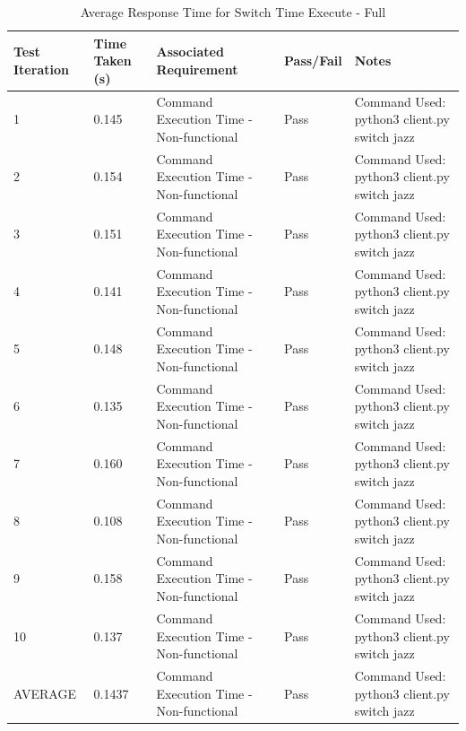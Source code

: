 \begin{table}[H]
  \centering
  \caption{Average Response Time for Switch Time Execute - Full}
  \label{tab:avgResTimeFullSwTE}
  \begin{tabularx}{\linewidth}{XlXlX}
    \toprule
    Test Iteration & Time Taken (s) & Associated Requirement & Pass/Fail & Notes \\
    \midrule
    1  & 0.145 & Command Execution Time - Non-functional & Pass & Command Used: python3 client.py switch jazz \\
    2  & 0.154 & Command Execution Time - Non-functional & Pass & Command Used: python3 client.py switch jazz \\
    3  & 0.151 & Command Execution Time - Non-functional & Pass & Command Used: python3 client.py switch jazz \\
    4  & 0.141 & Command Execution Time - Non-functional & Pass & Command Used: python3 client.py switch jazz \\
    5  & 0.148 & Command Execution Time - Non-functional & Pass & Command Used: python3 client.py switch jazz \\
    6  & 0.135 & Command Execution Time - Non-functional & Pass & Command Used: python3 client.py switch jazz \\
    7  & 0.160 & Command Execution Time - Non-functional & Pass & Command Used: python3 client.py switch jazz \\
    8  & 0.108 & Command Execution Time - Non-functional & Pass & Command Used: python3 client.py switch jazz \\
    9  & 0.158 & Command Execution Time - Non-functional & Pass & Command Used: python3 client.py switch jazz \\
    10 & 0.137 & Command Execution Time - Non-functional & Pass & Command Used: python3 client.py switch jazz \\
    \bottomrule
    AVERAGE & 0.1437 & Command Execution Time - Non-functional & Pass & Command Used: python3 client.py switch jazz \\
  \end{tabularx}
\end{table}
 

